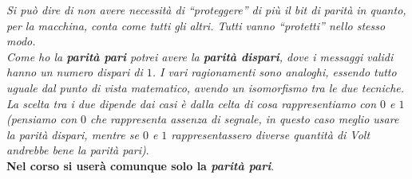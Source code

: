\documentclass[a4paper,12pt, oneside]{book}
\begin{document}
\textit{Si può dire di non avere necessità di ``proteggere'' di più il bit di
  parità in quanto, per la macchina, conta come tutti gli altri. Tutti vanno
  ``protetti'' nello stesso modo.}\\
\textit{Come ho la \textbf{parità pari} potrei avere la \textbf{parità dispari},
dove i messaggi validi hanno un numero dispari di $1$. I vari ragionamenti sono
analoghi, essendo tutto uguale dal punto di vista matematico, avendo un
isomorfismo tra le due tecniche. La scelta tra i due dipende dai casi è dalla
celta di cosa rappresentiamo con $0$ e $1$ (pensiamo con $0$ che rappresenta
assenza di segnale, in questo caso meglio usare la parità dispari, mentre se $0$
e $1$ rappresentassero diverse quantità di Volt andrebbe bene la parità
pari)}. \\ 
\textbf{Nel corso si userà comunque solo la \textit{parità pari}}.
\end{document}
